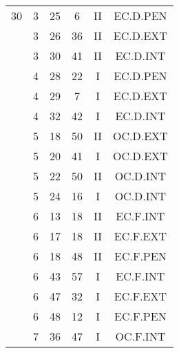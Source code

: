 \documentclass[12pt, a4paper]{article}
\begin{document}
\begin{multicols}{3}
{\begin{tabular}{c c c c c c}
	 	 	 	30 & 3 & 25 & 6 & II & EC.D.PEN\\%
	 	 	 	 & 3 & 26 & 36 & II & EC.D.EXT\\%
	 	 	 	 & 3 & 30 & 41 & II & EC.D.INT\\%
	 	 	 	 & 4 & 28 & 22 & I & EC.D.PEN\\%
	 	 	 	 & 4 & 29 & 7 & I & EC.D.EXT\\%
	 	 	 	 & 4 & 32 & 42 & I & EC.D.INT\\%
	 	 	 	 & 5 & 18 & 50 & II & OC.D.EXT\\%
	 	 	 	 & 5 & 20 & 41 & I & OC.D.EXT\\%
	 	 	 	 & 5 & 22 & 50 & II & OC.D.INT\\%
	 	 	 	 & 5 & 24 & 16 & I & OC.D.INT\\%
	 	 	 	 & 6 & 13 & 18 & II & EC.F.INT\\%
	 	 	 	 & 6 & 17 & 18 & II & EC.F.EXT\\%
	 	 	 	 & 6 & 18 & 48 & II & EC.F.PEN\\%
	 	 	 	 & 6 & 43 & 57 & I & EC.F.INT\\%
	 	 	 	 & 6 & 47 & 32 & I & EC.F.EXT\\%
	 	 	 	 & 6 & 48 & 12 & I & EC.F.PEN\\%
	 	 	 	 & 7 & 36 & 47 & I & OC.F.INT\\%
	 	 \end{tabular}
 	}
\end{multicols}
\end{document}
